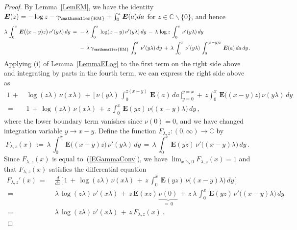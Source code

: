 \documentclass[10pt]{article}
\numberwithin{equation}{section}
\theoremstyle{definition}
\newcommand{\C}{{\mathbb C}}
\begin{document}
\begin{proof} By Lemma~\ref{LemEM}, we have the identity $\boldsymbol{E}(z)=-\log z-\gamma_{\mathsmaller{\textup{EM}}}+\int_{0}^{z}\boldsymbol{E}(a)da  $ for $z\in \C\backslash \{0\}$, and hence  
\begin{align*}\lambda \,\int_0^{x} \,\boldsymbol{E}\big((x-y)z\big)\,\nu'( y\lambda)\,dy \,=\,& \, -\lambda\,\int_0^{x}\,\log(x-y)\, \nu'( y\lambda)\,dy \,-\,\lambda \,\log z \,\int_0^{x} \,\nu'( y\lambda)\,dy \nonumber \\  &\, - \,\lambda \, \gamma_{\mathsmaller{\textup{EM}}} \,\int_0^{x}\,\nu'( y\lambda)\,dy\,+\,\lambda\, \int_0^{x}\, \nu'(y\lambda ) \,\int_{0}^{(x-y)z}\,\boldsymbol{E}(a)\,da\,dy\,.
\end{align*}
Applying (i) of Lemma~\ref{LemmaELog} to the first term on the right side above and integrating by parts in the fourth term, we can express the right side above as
\begin{align} \label{EGammaConv}
 1\, +&\,\log( z\lambda)\,\nu( x \lambda)   \,+\, \bigg[\, \nu( y\lambda )\, \int_{0}^{z(x-y)}\,\boldsymbol{E}(a)\,da \,\bigg]_{y=0}^{y=x} \,+\,z\int_0^{x}  \,\boldsymbol{E}\big((x-y)z\big)\,\nu( y\lambda)\, dy \nonumber \\    \,=\,&\, 1\, +\,\log( z\lambda)\, \nu( x \lambda ) 
  \,+\,z\,\int_0^{x}\,  \boldsymbol{E}(yz)\,\nu\big( (x-y)\lambda\big)\, dy\,,
\end{align}
where the lower boundary term  vanishes since $\nu(0)=0$, and we have changed integration variable $y\rightarrow x-y$.  Define the function $F_{\lambda,z}:(0,\infty)\rightarrow  \C$   by  
$$F_{\lambda,z}(x)\,:=\,\lambda \,\int_0^{x}\,\boldsymbol{E}\big((x-y)z\big)\, \nu'(y\lambda )\,dy\,=\,\lambda\,\int_0^{x} \,\boldsymbol{E}(yz)  \,\nu'\big( (x-y)\lambda\big)\,dy\,. $$
Since $F_{\lambda,z}(x)$ is equal to~(\ref{EGammaConv}), we have  $\lim_{x\searrow 0}F_{\lambda,z}(x)=1$ and that $F_{\lambda,z}(x)$ satisfies  the differential equation
\begin{align*}
F_{\lambda,z}'(x)\,=\,&\,\frac{d}{dx}\bigg[\, 1\, +\,\log( z\lambda)\, \nu( x \lambda ) 
  \,+\,z\,\int_0^{x} \, \boldsymbol{E}( yz)\,\nu\big((x- y)\lambda\big)\, dy \, \bigg]\nonumber \\
  \,=\,&\,\lambda \,\log( z\lambda)\, \nu'( x\lambda ) 
  \,+\,z\,\boldsymbol{E}(xz)\,\underbrace{\nu(0)}_{=\,0} \,+\,z\,\lambda \,\int_0^{x}\, \boldsymbol{E}( yz) \,\nu'\big( (x- y)\lambda\big)\, dy \nonumber  \\  \,=\,&\,\lambda \,\log( z \lambda)\, \nu'( x \lambda) 
  \,+\,z\,F_{\lambda,z}(x) \,.\nonumber 

\end{align*}
\end{proof}
\end{document}
